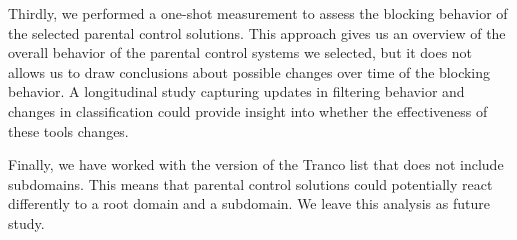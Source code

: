 Thirdly, we performed a one-shot measurement to assess the blocking behavior of the selected parental control solutions. This approach gives us an overview of the overall behavior of the parental control systems we selected, but it does not allows us to draw conclusions about possible changes over time of the blocking behavior. A longitudinal study capturing updates in filtering behavior and changes in classification could provide insight into whether the effectiveness of these tools changes.

Finally, we have worked with the version of the Tranco list that does not include subdomains. This means that parental control solutions could potentially react differently to a root domain and a subdomain. We leave this analysis as future study.





